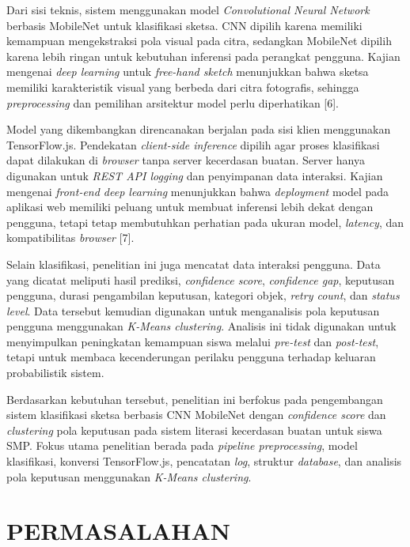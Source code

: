 \documentclass[10pt,twoside,openright]{report}
\begin{document}
Dari sisi teknis, sistem menggunakan model \textit{Convolutional Neural Network} berbasis MobileNet untuk klasifikasi sketsa. CNN dipilih karena memiliki kemampuan mengekstraksi pola visual pada citra, sedangkan MobileNet dipilih karena lebih ringan untuk kebutuhan inferensi pada perangkat pengguna. Kajian mengenai \textit{deep learning} untuk \textit{free-hand sketch} menunjukkan bahwa sketsa memiliki karakteristik visual yang berbeda dari citra fotografis, sehingga \textit{preprocessing} dan pemilihan arsitektur model perlu diperhatikan [6].

Model yang dikembangkan direncanakan berjalan pada sisi klien menggunakan TensorFlow.js. Pendekatan \textit{client-side inference} dipilih agar proses klasifikasi dapat dilakukan di \textit{browser} tanpa server kecerdasan buatan. Server hanya digunakan untuk \textit{REST API logging} dan penyimpanan data interaksi. Kajian mengenai \textit{front-end deep learning} menunjukkan bahwa \textit{deployment} model pada aplikasi web memiliki peluang untuk membuat inferensi lebih dekat dengan pengguna, tetapi tetap membutuhkan perhatian pada ukuran model, \textit{latency}, dan kompatibilitas \textit{browser} [7].

Selain klasifikasi, penelitian ini juga mencatat data interaksi pengguna. Data yang dicatat meliputi hasil prediksi, \textit{confidence score}, \textit{confidence gap}, keputusan pengguna, durasi pengambilan keputusan, kategori objek, \textit{retry count}, dan \textit{status level}. Data tersebut kemudian digunakan untuk menganalisis pola keputusan pengguna menggunakan \textit{K-Means clustering}. Analisis ini tidak digunakan untuk menyimpulkan peningkatan kemampuan siswa melalui \textit{pre-test} dan \textit{post-test}, tetapi untuk membaca kecenderungan perilaku pengguna terhadap keluaran probabilistik sistem.

Berdasarkan kebutuhan tersebut, penelitian ini berfokus pada pengembangan sistem klasifikasi sketsa berbasis CNN MobileNet dengan \textit{confidence score} dan \textit{clustering} pola keputusan pada sistem literasi kecerdasan buatan untuk siswa SMP. Fokus utama penelitian berada pada \textit{pipeline preprocessing}, model klasifikasi, konversi TensorFlow.js, pencatatan \textit{log}, struktur \textit{database}, dan analisis pola keputusan menggunakan \textit{K-Means clustering}.

\section{PERMASALAHAN}
\label{sec:permasalahan}
\end{document}
